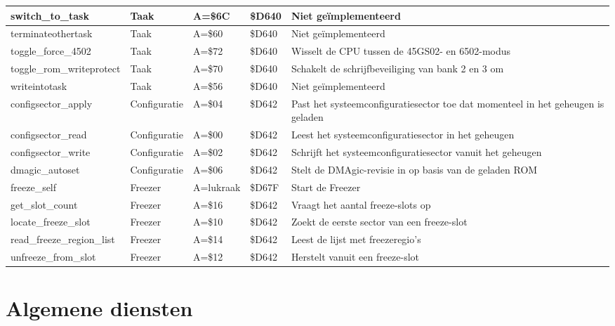\begin{longtable}{|L{4cm}|p{2cm}|L{1.5cm}|L{1.2cm}|L{4.3cm}|}
\hline
switch\_to\_task & Taak & A=\$6C & \$D640 & Niet geïmplementeerd \\
\hline
terminateothertask & Taak & A=\$60 & \$D640 & Niet geïmplementeerd \\
\hline
toggle\_force\_4502 & Taak & A=\$72 & \$D640 & Wisselt de CPU tussen de 45GS02- en 6502-modus \\
\hline
toggle\_rom\_writeprotect & Taak & A=\$70 & \$D640 & Schakelt de schrijfbeveiliging van bank 2 en 3 om \\
\hline
writeintotask & Taak & A=\$56 & \$D640 & Niet geïmplementeerd \\
\hline
configsector\_apply & Configuratie & A=\$04 & \$D642 & Past het systeemconfiguratiesector toe dat momenteel in het geheugen is geladen \\
\hline
configsector\_read & Configuratie  & A=\$00 & \$D642 & Leest het systeemconfiguratiesector in het geheugen \\
\hline
configsector\_write & Configuratie & A=\$02 & \$D642 & Schrijft het systeemconfiguratiesector vanuit het geheugen \\
\hline
dmagic\_autoset & Configuratie & A=\$06 & \$D642 & Stelt de DMAgic-revisie in op basis van de geladen ROM \\
\hline
freeze\_self & Freezer & A=lukraak & \$D67F & Start de Freezer \\
\hline
get\_slot\_count & Freezer & A=\$16 & \$D642 & Vraagt het aantal freeze-slots op \\
\hline
locate\_freeze\_slot & Freezer & A=\$10 & \$D642 & Zoekt de eerste sector van een freeze-slot \\
\hline
read\_freeze\_region\_list & Freezer & A=\$14 & \$D642 & Leest de lijst met freezeregio's \\
\hline
unfreeze\_from\_slot & Freezer & A=\$12 & \$D642 & Herstelt vanuit een freeze-slot \\
\hline
\end{longtable}


\newpage
\section{Algemene diensten}


